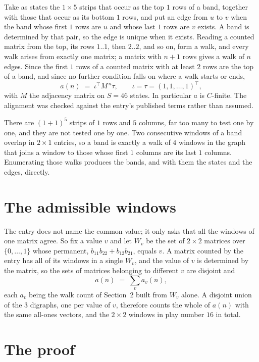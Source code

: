 \documentclass[11pt,a4paper]{article}
\theoremstyle{plain}
\theoremstyle{definition}
\begin{document}
Take as states the $1\times5$ strips that occur as the top $1$ rows of a band,
together with those that occur as its bottom $1$ rows, and put an edge from $u$ to $v$
when the band whose first $1$ rows are $u$ and whose last $1$ rows are $v$ exists.
A band is determined by that pair, so the edge is unique when it exists. Reading a counted
matrix from the top, its rows $1..1$, then $2..2$, and so on, form a walk, and every
walk arises from exactly one matrix; a matrix with $n+1$ rows gives a walk of $n$ edges.
Since the first $1$ rows of a counted matrix with at least $2$ rows are the top of a
band, and since no further condition falls on where a walk starts or ends,
\[
a(n)\;=\;\iota^{\!\top}M^{\,n}\tau ,\qquad \iota=\tau=(1,1,\dots,1)^{\!\top},
\]
with $M$ the adjacency matrix on $S=46$ states. In particular $a$ is $C$-finite. The
alignment was checked against the entry's published terms rather than assumed.

There are $(1 + 1)^{5}$ strips of $1$ rows and $5$ columns, far too
many to test one by one, and they are not tested one by one. Two consecutive windows of a band
overlap in $2\times1$ entries, so a band is exactly a walk of $4$ windows in
the graph that joins a window to those whose first $1$ columns are its last $1$
columns. Enumerating those walks produces the bands, and with them the states and the edges,
directly.

\section{The admissible windows}

The entry does not name the common value; it only asks that all the windows of one matrix agree.
So fix a value $v$ and let $W_v$ be the set of $2\times2$ matrices over
$\{0,\dots,1\}$ whose permanent, $b_{11}b_{22}+b_{12}b_{21}$, equals $v$. A matrix counted by the entry has all of
its windows in a single $W_v$, and the value of $v$ is determined by the matrix, so the sets of
matrices belonging to different $v$ are disjoint and
\[
a(n)\;=\;\sum_v a_v(n),
\]
each $a_v$ being the walk count of Section~2 built from $W_v$ alone. A disjoint union of the
$3$ digraphs, one per value of $v$, therefore counts the whole of $a(n)$ with the same
all-ones vectors, and the $2\times2$ windows in play number $16$ in total.

\section{The proof}
\end{document}
